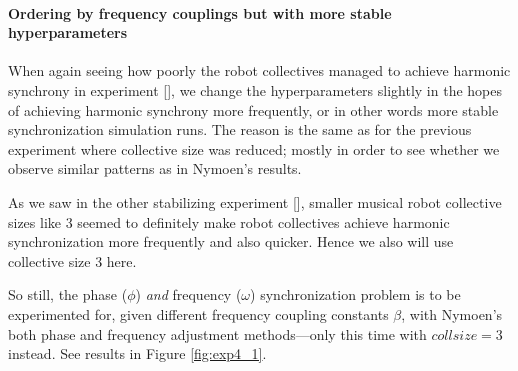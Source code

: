 		
		
		\paragraph{Ordering by frequency couplings but with more stable hyperparameters}
		
		When again seeing how poorly the robot collectives managed to achieve harmonic synchrony in experiment [], we change the hyperparameters slightly in the hopes of achieving harmonic synchrony more frequently, or in other words more stable synchronization simulation runs. The reason is the same as for the previous experiment where collective size was reduced; mostly in order to see whether we observe similar patterns as in Nymoen's results.
				
		As we saw in the other stabilizing experiment [], smaller musical robot collective sizes like 3 seemed to definitely make robot collectives achieve harmonic synchronization more frequently and also quicker. Hence we also will use collective size 3 here.
		
		So still, the phase ($\phi$) \textit{and} frequency ($\omega$) synchronization problem is to be experimented for, given different frequency coupling constants $\beta$, with Nymoen's both phase and frequency adjustment methods—only this time with $collsize=3$ instead. See results in Figure \ref{fig:exp4_1}.
		
		
